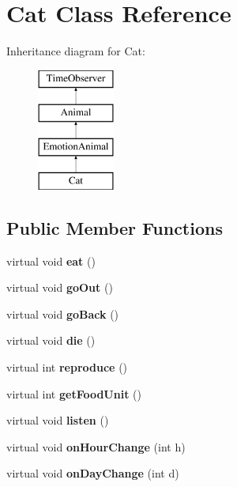 \hypertarget{class_cat}{}\section{Cat Class Reference}
\label{class_cat}
Inheritance diagram for Cat\+:\begin{figure}[H]
\begin{center}
\leavevmode
\includegraphics[height=4.000000cm]{class_cat}
\end{center}
\end{figure}
\subsection*{Public Member Functions}
\begin{DoxyCompactItemize}
\item 
\mbox{\label{class_cat_a66ece6598afa3205ff6291323ff24964}} 
virtual void {\bfseries eat} ()
\item 
\mbox{\label{class_cat_a6cf8b6c4daf93d9e89cb5665b8df3937}} 
virtual void {\bfseries go\+Out} ()
\item 
\mbox{\label{class_cat_af75e2455e9f7f664d1f5dfd1ece285e7}} 
virtual void {\bfseries go\+Back} ()
\item 
\mbox{\label{class_cat_aed1c7db476cda98bddd8f649cb0a4fbf}} 
virtual void {\bfseries die} ()
\item 
\mbox{\label{class_cat_ae391b6b7c157fc4f64ed76ea1f4d1b89}} 
virtual int {\bfseries reproduce} ()
\item 
\mbox{\label{class_cat_a95bc477b452b53547ef1158d6349db73}} 
virtual int {\bfseries get\+Food\+Unit} ()
\item 
\mbox{\label{class_cat_aede6b89d75f9a11fc4992a1023bc69c8}} 
virtual void {\bfseries listen} ()
\item 
\mbox{\label{class_cat_a1776cfe2d85ec783cc2f73a9adb7c09c}} 
virtual void {\bfseries on\+Hour\+Change} (int h)
\item 
\mbox{\label{class_cat_a352d9f1603003aa4bb5e5cd8607cd27a}} 
virtual void {\bfseries on\+Day\+Change} (int d)
\end{DoxyCompactItemize}
